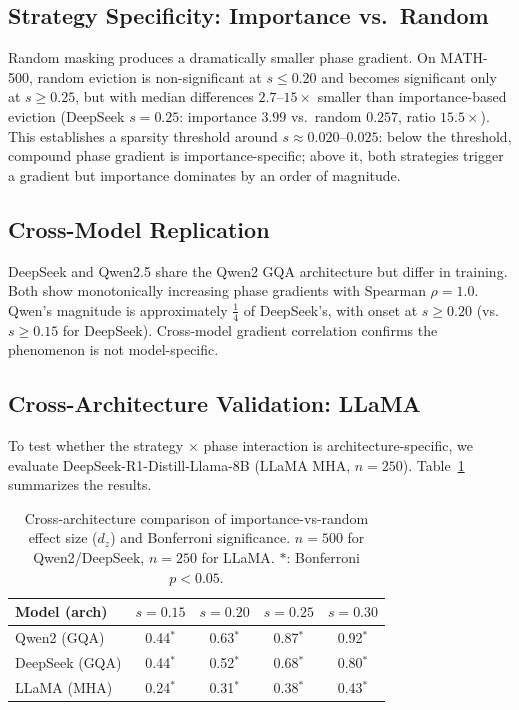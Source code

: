 \documentclass[11pt,a4paper]{article}
\begin{document}
\subsection{Strategy Specificity: Importance vs.\ Random}
\label{sec:strategy}

Random masking produces a dramatically smaller phase gradient.
On MATH-500, random eviction is non-significant at $s \leq 0.20$ and becomes significant only at $s \geq 0.25$, but with median differences $2.7$--$15\times$ smaller than importance-based eviction (DeepSeek $s\!=\!0.25$: importance $3.99$ vs.\ random $0.257$, ratio $15.5\times$).
This establishes a sparsity threshold around $s \approx 0.020$--$0.025$: below the threshold, compound phase gradient is importance-specific; above it, both strategies trigger a gradient but importance dominates by an order of magnitude.

\subsection{Cross-Model Replication}
\label{sec:cross_model}

DeepSeek and Qwen2.5 share the Qwen2 GQA architecture but differ in training.
Both show monotonically increasing phase gradients with Spearman $\rho = 1.0$.
Qwen's magnitude is approximately $\frac{1}{4}$ of DeepSeek's, with onset at $s \geq 0.20$ (vs.\ $s \geq 0.15$ for DeepSeek).
Cross-model gradient correlation confirms the phenomenon is not model-specific.

\subsection{Cross-Architecture Validation: LLaMA}
\label{sec:llama}

To test whether the strategy $\times$ phase interaction is architecture-specific, we evaluate DeepSeek-R1-Distill-Llama-8B (LLaMA MHA, $n\!=\!250$).
Table~\ref{tab:cross_arch} summarizes the results.

\begin{table}[t]
\centering
\small
\caption{Cross-architecture comparison of importance-vs-random effect size ($d_z$) and Bonferroni significance. $n\!=\!500$ for Qwen2/DeepSeek, $n\!=\!250$ for LLaMA. $*$: Bonferroni $p < 0.05$.}
\label{tab:cross_arch}
\begin{tabular}{@{}lcccc@{}}
\toprule
Model (arch) & $s\!=\!0.15$ & $s\!=\!0.20$ & $s\!=\!0.25$ & $s\!=\!0.30$ \\
\midrule
Qwen2 (GQA) & 0.44$^*$ & 0.63$^*$ & 0.87$^*$ & 0.92$^*$ \\
DeepSeek (GQA) & 0.44$^*$ & 0.52$^*$ & 0.68$^*$ & 0.80$^*$ \\
LLaMA (MHA) & 0.24$^*$ & 0.31$^*$ & 0.38$^*$ & 0.43$^*$ \\
\bottomrule
\end{tabular}
\end{table}
\end{document}
